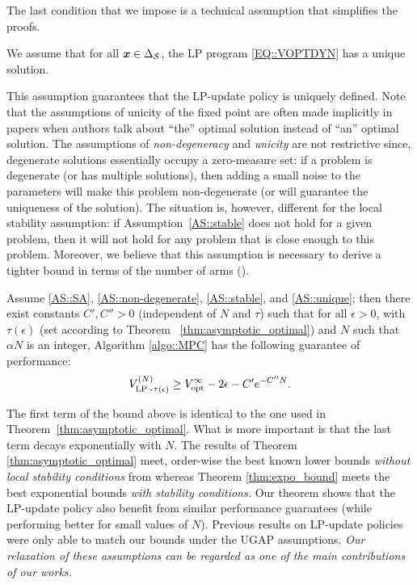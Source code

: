 The last condition that we impose is a technical assumption that simplifies the proofs. 
\begin{assumption}[Unicity]%
    \label{AS::unique}
    We assume that for all ${\bm{x}}\in\Delta_{\mathcal{S}}$, the LP program \eqref{EQ::VOPTDYN} has a unique solution.
\end{assumption}
This assumption guarantees that the LP-update policy is uniquely defined. Note that the assumptions of unicity of the fixed point are often made implicitly in papers when authors talk about ``the'' optimal solution instead of ``an'' optimal solution. The assumptions of \emph{non-degeneracy} and \emph{unicity} are not restrictive since, degenerate solutions essentially occupy a zero-measure set: if a problem is degenerate (or has multiple solutions), then adding a small noise to the parameters will make this problem non-degenerate (or will guarantee the uniqueness of the solution). The situation is, however, different for the local stability assumption: if Assumption~\ref{AS::stable} does not hold for a given problem, then it will not hold for any problem that is close enough to this problem. Moreover, we believe that this assumption is necessary to derive a tighter bound in terms of the number of arms (\cite{HXCW24}).

\begin{theorem}
    \label{thm:expo_bound}
    Assume \ref{AS::SA},  \ref{AS::non-degenerate}, \ref{AS::stable}, and \ref{AS::unique}; then there exist constants $C',C''>0$ (independent of $N$ and $\tau$) such that for all $\epsilon>0$, with $\tau(\epsilon)$ (set according to Theorem ~\ref{thm:asymptotic_optimal}) and $N$ such that $\alpha N$ is an integer, Algorithm \ref{algo::MPC} has the following guarantee of performance:
    \begin{equation}
        V_{\text{LP -}\tau(\epsilon)}^{(N)} \ge V_{\text{opt}}^{\infty} - 2\epsilon - C'e^{-C'' N}.
    \end{equation}
\end{theorem}
The first term of the bound above is identical to the one used in Theorem~\ref{thm:asymptotic_optimal}. What is more important is that the last term  decays exponentially with $N$. The results of Theorem \ref{thm:asymptotic_optimal} meet, order-wise the best known lower bounds \emph{without local stability conditions} from \cite{HXCW24} whereas Theorem \ref{thm:expo_bound} meets the best exponential bounds \emph{with stability conditions.} Our theorem shows that the LP-update policy also benefit from similar performance guarantees (while performing better for small values of $N$).  Previous results on LP-update policies were only able to match our bounds under the UGAP assumptions. \emph{Our relaxation of these assumptions can be regarded as one of the main contributions of our works.}

